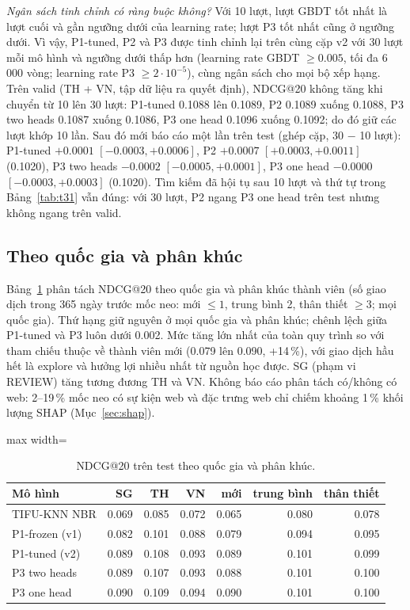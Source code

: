 \documentclass[jtehm]{ieeeaccess}
\begin{document}
\textit{Ngân sách tinh chỉnh có ràng buộc không?} Với 10 lượt, lượt GBDT tốt nhất là lượt cuối và gần ngưỡng dưới của learning rate; lượt P3 tốt nhất cũng ở ngưỡng dưới. Vì vậy, P1-tuned, P2 và P3 được tinh chỉnh lại trên cùng cặp v2 với 30 lượt mỗi mô hình và ngưỡng dưới thấp hơn (learning rate GBDT $\ge 0.005$, tối đa 6\,000 vòng; learning rate P3 $\ge 2 \cdot 10^{-5}$), cùng ngân sách cho mọi bộ xếp hạng. Trên valid (TH + VN, tập dữ liệu ra quyết định), NDCG@20 không tăng khi chuyển từ 10 lên 30 lượt: P1-tuned 0.1088 lên 0.1089, P2 0.1089 xuống 0.1088, P3 two heads 0.1087 xuống 0.1086, P3 one head 0.1096 xuống 0.1092; do đó giữ các lượt khớp 10 lần. Sau đó mới báo cáo một lần trên test (ghép cặp, 30 $-$ 10 lượt): P1-tuned $+0.0001$ $[-0.0003, +0.0006]$, P2 $+0.0007$ $[+0.0003, +0.0011]$ (0.1020), P3 two heads $-0.0002$ $[-0.0005, +0.0001]$, P3 one head $-0.0000$ $[-0.0003, +0.0003]$ (0.1020). Tìm kiếm đã hội tụ sau 10 lượt và thứ tự trong Bảng~\ref{tab:t31} vẫn đúng: với 30 lượt, P2 ngang P3 one head trên test nhưng không ngang trên valid.

\subsection{Theo quốc gia và phân khúc}
Bảng~\ref{tab:segments} phân tách NDCG@20 theo quốc gia và phân khúc thành viên (số giao dịch trong 365 ngày trước mốc neo: mới $\le 1$, trung bình 2, thân thiết $\ge 3$; mọi quốc gia). Thứ hạng giữ nguyên ở mọi quốc gia và phân khúc; chênh lệch giữa P1-tuned và P3 luôn dưới 0.002. Mức tăng lớn nhất của toàn quy trình so với tham chiếu thuộc về thành viên mới (0.079 lên 0.090, +14\,\%), với giao dịch hầu hết là explore và hưởng lợi nhiều nhất từ nguồn học được. SG (phạm vi REVIEW) tăng tương đương TH và VN. Không báo cáo phân tách có/không có web: 2--19\,\% mốc neo có sự kiện web và đặc trưng web chỉ chiếm khoảng 1\,\% khối lượng SHAP (Mục~\ref{sec:shap}).

\begin{table}[t]
\caption{NDCG@20 trên test theo quốc gia và phân khúc.}
\label{tab:segments}
\setlength{\tabcolsep}{3pt}
\centering
\begin{adjustbox}{max width=\columnwidth}
\begin{tabular}{lrrrrrr}
\toprule
Mô hình & SG & TH & VN & mới & trung bình & thân thiết \\
\midrule
TIFU-KNN NBR    & 0.069 & 0.085 & 0.072 & 0.065 & 0.080 & 0.078 \\
P1-frozen (v1)  & 0.082 & 0.101 & 0.088 & 0.079 & 0.094 & 0.095 \\
P1-tuned (v2)   & 0.089 & 0.108 & 0.093 & 0.089 & 0.101 & 0.099 \\
P3 two heads    & 0.089 & 0.107 & 0.093 & 0.088 & 0.101 & 0.100 \\
P3 one head     & 0.090 & 0.109 & 0.094 & 0.090 & 0.101 & 0.100 \\
\bottomrule
\end{tabular}
\end{adjustbox}
\end{table}
\end{document}
